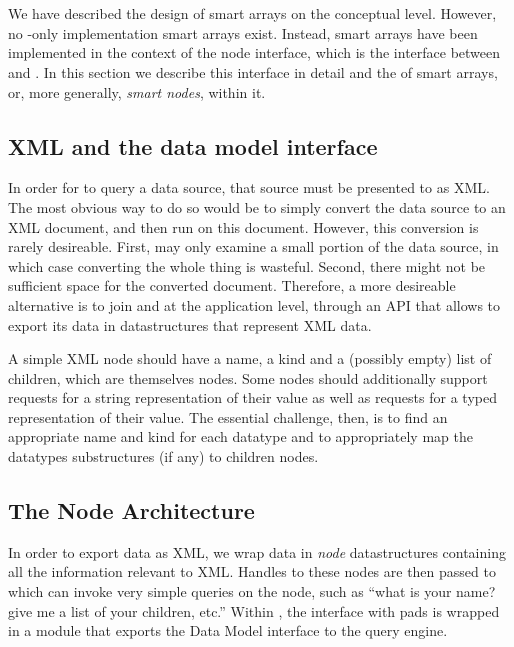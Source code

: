 \documentclass{article}
\begin{document}
\section{\pglx}
\label{sec:pads-galax}

We have described the design of smart arrays on the conceptual
level. However, no {\pads}-only implementation smart arrays
exist. Instead, smart arrays have been implemented in the context of the \pglx node
interface, which is the interface between \galax and \pads. In this
section we describe this interface in detail and the of smart arrays,
or, more generally, {\em smart nodes}, within it.

\subsection{XML and the data model interface}
\label{subsec:xml-dm}

In order for \galax to query a \pads data source, that source must be
presented to \galax as XML. The most obvious way to do so would be to
simply convert the data source to an XML document, and then run \galax
on this document. However, this conversion is rarely desireable.
First, \galax may only examine a small portion of the data source, in
which case converting the whole thing is wasteful.  Second, there
might not be sufficient space for the converted document. Therefore, a
more desireable alternative is to join \pads and \galax at the
application level, through an API that allows \pads to export its data
in datastructures that represent XML data.

A simple XML node should have a name, a kind and a (possibly empty)
list of children, which are themselves nodes. Some nodes should
additionally support requests for a string representation of their value
as well as requests for a typed representation of their value.  The
essential challenge, then, is to find an appropriate name and kind for
each \pads datatype and to appropriately map the datatypes
substructures (if any) to children nodes.

\subsection{The Node Architecture}
\label{subsec:node-arch}

In order to export \pads data as XML, we wrap data in {\em node}
datastructures containing all the information relevant to XML. Handles
to these nodes are then passed to \galax which can invoke very simple
queries on the node, such as ``what is your name? give me a list of
your children, etc.''  Within \galax, the interface with pads is
wrapped in a module that exports the \galax Data Model interface to
the \galax query engine.
\end{document}
